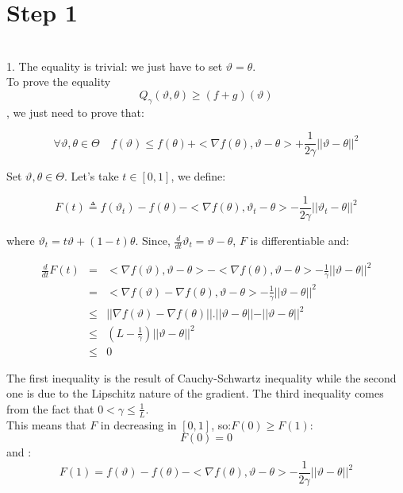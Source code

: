 	\section*{Step 1}
	~\\
	
	1. The equality is trivial: we just have to set $\vartheta=\theta$.\\
	
	To prove the equality $$ Q_{\gamma}(\vartheta,\theta)\geq (f+g)(\vartheta)$$, we just need to prove that:
	
	$$\forall \vartheta , \theta \in \Theta \quad f(\vartheta)\leq f(\theta)+<\nabla f(\theta),\vartheta-\theta>+\frac{1}{2\gamma}\vert\vert \vartheta-\theta\vert\vert^2$$
	
	Set $ \vartheta , \theta \in \Theta$. Let's take $t \in [0,1]$, we define:
	
	\begin{equation}
	F(t) \triangleq f(\vartheta_t)-f(\theta)-<\nabla f(\theta),\vartheta_t-\theta>-\frac{1}{2\gamma}\vert\vert \vartheta_t-\theta\vert\vert^2
	\end{equation}
	
	where $\vartheta_t=t \vartheta+(1-t)\theta$. Since, $\frac{d}{dt}\vartheta_t=\vartheta-\theta$, $F$ is differentiable and:
	
	\begin{eqnarray*}
		\frac{d}{dt}F(t)&=& <\nabla f(\vartheta), \vartheta-\theta> - <\nabla f(\theta), \vartheta-\theta>-\frac{1}{\gamma}\vert\vert \vartheta-\theta\vert\vert^2\\
							&=& <\nabla f(\vartheta)- \nabla f(\theta), \vartheta-\theta> -\frac{1}{\gamma}\vert\vert \vartheta-\theta\vert\vert^2\\
							&\leq& \vert\vert  \nabla f(\vartheta)- \nabla f(\theta)\vert \vert . \vert \vert \vartheta-\theta\vert \vert -\vert\vert \vartheta-\theta\vert\vert^2\\
							&\leq& (L-\frac{1}{\gamma})\vert\vert \vartheta-\theta\vert\vert^2\\
							&\leq& 0
	\end{eqnarray*}
	
	The first inequality is the result of Cauchy-Schwartz inequality while the second one is due to the Lipschitz nature of the gradient. The third inequality comes from the fact that $0<\gamma\leq \frac{1}{L}$.\\
	This means that $F$ in decreasing in $[0,1]$, so:$F(0)\geq F(1)$:
	$$F(0)=0$$
	and :
	$$F(1)=f(\vartheta)- f(\theta)-<\nabla f(\theta),\vartheta-\theta>-\frac{1}{2\gamma}\vert\vert \vartheta-\theta\vert\vert^2$$
	
